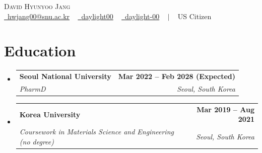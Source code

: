 \documentclass[letterpaper,11pt]{article}
\makeatletter
\newcommand{\resumeSubheading}[4]{
\vspace{-2pt}\item
\begin{tabular*}{1.0\textwidth}[t]{l@{\extracolsep{\fill}}r}
\textbf{#1} & \textbf{\small #2} \\
\textit{\small#3} & \textit{\small #4} \\
\end{tabular*}\vspace{-7pt}
}
\newcommand{\resumeSubHeadingListStart}{\begin{itemize}[leftmargin=0.0in, label={}]}
\newcommand{\resumeSubHeadingListEnd}{\end{itemize}}
\makeatother
\begin{document}
\begin{center}
{\Huge \scshape David Hyunyoo Jang} \\ \vspace{1pt}
\small 
\href{mailto:hwjang00@snu.ac.kr}{\raisebox{-0.2\height}\faEnvelope\ {hwjang00@snu.ac.kr}} ~ 
\href{https://linkedin.com/in/daylight00/}{\raisebox{-0.2\height}\faLinkedin\ {daylight00}}  ~
\href{https://github.com/daylight-00}{\raisebox{-0.2\height}\faGithub\ {daylight-00}} ~ $|$ ~ US Citizen
\vspace{-8pt}
\end{center}


\section{Education}
\resumeSubHeadingListStart
\resumeSubheading
{Seoul National University}{Mar 2022 -- Feb 2028 (Expected)}
{PharmD}{Seoul, South Korea}
\resumeSubheading
{Korea University}{Mar 2019 -- Aug 2021}
{Coursework in Materials Science and Engineering (no degree)}{Seoul, South Korea}
\resumeSubHeadingListEnd


\end{document}
